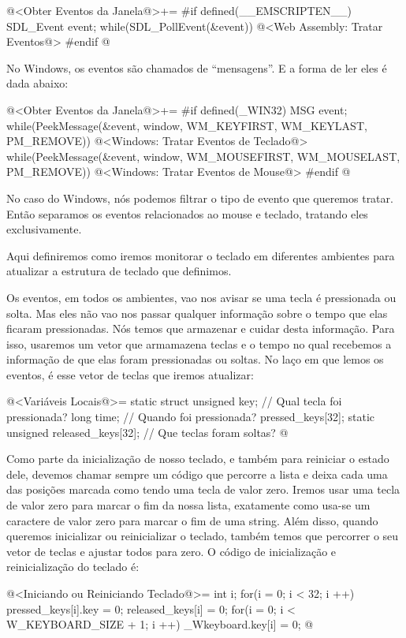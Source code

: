\iniciocodigo
@<Obter Eventos da Janela@>+=
#if defined(__EMSCRIPTEN__)
SDL_Event event;
while(SDL_PollEvent(&event)){
  @<Web Assembly: Tratar Eventos@>
}
#endif
@
\fimcodigo

No Windows, os eventos são chamados de ``mensagens''. E a forma de ler
eles é dada abaixo:

\iniciocodigo
@<Obter Eventos da Janela@>+=
#if defined(_WIN32)
MSG event;
while(PeekMessage(&event, window, WM_KEYFIRST, WM_KEYLAST, PM_REMOVE)){
  @<Windows: Tratar Eventos de Teclado@>
}
while(PeekMessage(&event, window, WM_MOUSEFIRST, WM_MOUSELAST, PM_REMOVE)){
  @<Windows: Tratar Eventos de Mouse@>
}
#endif
@
\fimcodigo

No caso do Windows, nós podemos filtrar o tipo de evento que queremos
tratar. Então separamos os eventos relacionados ao mouse e teclado,
tratando eles exclusivamente.


Aqui definiremos como iremos monitorar o teclado em diferentes
ambientes para atualizar a estrutura de teclado que definimos.

Os eventos, em todos os ambientes, vao nos avisar se uma tecla é
pressionada ou solta. Mas eles não vao nos passar qualquer informação
sobre o tempo que elas ficaram pressionadas. Nós temos que armazenar e
cuidar desta informação. Para isso, usaremos um vetor que armamazena
teclas e o tempo no qual recebemos a informação de que elas foram
pressionadas ou soltas. No laço em que lemos os eventos, é esse vetor
de teclas que iremos atualizar:

\iniciocodigo
@<Variáveis Locais@>=
static struct{
  unsigned key; // Qual tecla foi pressionada?
  long time;    // Quando foi pressionada?
} pressed_keys[32];
static unsigned released_keys[32]; // Que teclas foram soltas?
@
\fimcodigo

Como parte da inicialização de nosso teclado, e também para reiniciar
o estado dele, devemos chamar sempre um código que percorre a lista e
deixa cada uma das posições marcada como tendo uma tecla de valor
zero. Iremos usar uma tecla de valor zero para marcar o fim da nossa
lista, exatamente como usa-se um caractere de valor zero para marcar o
fim de uma string. Além disso, quando queremos inicializar ou
reinicializar o teclado, também temos que percorrer o seu vetor de
teclas e ajustar todos para zero. O código de inicialização e
reinicialização do teclado é:

\iniciocodigo
@<Iniciando ou Reiniciando Teclado@>=
{
  int i;
  for(i = 0; i < 32; i ++){
    pressed_keys[i].key = 0;
    released_keys[i] = 0;
  }
  for(i = 0; i < W_KEYBOARD_SIZE + 1; i ++)
    _Wkeyboard.key[i] = 0;
}
@
\fimcodigo

